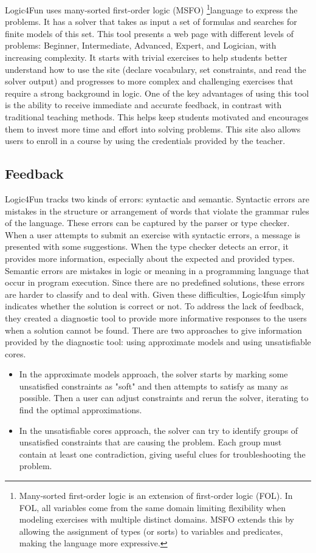Logic4Fun uses many-sorted first-order logic (MSFO) \footnote{Many-sorted first-order logic is an extension of first-order logic (FOL). In FOL, all variables 
come from the same domain limiting flexibility when modeling exercises with multiple distinct domains. MSFO extends this by allowing the assignment of types (or sorts) to variables and predicates, making the language more expressive.}language to express the problems. It has a solver that takes as input a set of formulas and searches for finite models of this set. This tool presents a web page with different levels of problems: Beginner, Intermediate, Advanced, Expert, and Logician, with increasing complexity. It starts with trivial exercises to help students better understand how to use the site (declare vocabulary, set constraints, and read the solver output) and progresses to more complex and challenging exercises that require a strong background in logic. One of the key advantages of using this tool is the ability to receive immediate and accurate feedback, in contrast with traditional teaching methods. This helps keep students motivated and encourages them to invest more time and effort into solving problems. This site also allows users to enroll in a course by using the credentials provided by the teacher.

\subsection{Feedback}
Logic4Fun tracks two kinds of errors: syntactic and semantic. Syntactic errors are mistakes in the structure or arrangement of words that violate the grammar rules of the language. These errors can be captured by the parser or type checker. When a user attempts to submit an exercise with syntactic errors, a message is presented with some suggestions. When the type checker detects an error, it provides more information, especially about the expected and provided types. Semantic errors are mistakes in logic or meaning in a programming language that occur in program execution. Since there are no predefined solutions, these errors are harder to classify and to deal with. Given these difficulties, Logic4fun simply indicates whether the solution is correct or not. To address the lack of feedback, they created a diagnostic tool to provide more informative responses to the users when a solution cannot be found. There are two approaches to give information provided by the diagnostic tool: using approximate models and using unsatisfiable cores.
\begin{itemize}
    \item In the approximate models approach, the solver starts by marking some unsatisfied constraints as "soft" and then attempts to satisfy as many as possible. Then a user can adjust constraints and rerun the solver, iterating to find the optimal approximations.
    \item In the unsatisfiable cores approach, the solver can try to identify groups of unsatisfied constraints that are causing the problem. Each group must contain at least one contradiction, giving useful clues for troubleshooting the problem. 
\end{itemize}

